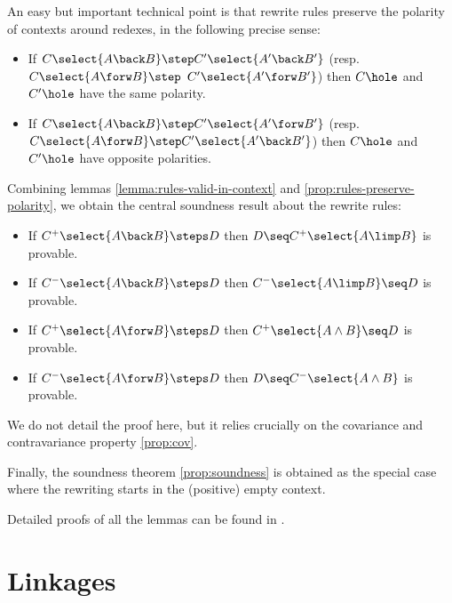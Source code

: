 An easy but important technical point is that rewrite rules preserve the
polarity of contexts around redexes, in the following precise sense:
\begin{lemma}\label{prop:rules-preserve-polarity}
  \phantom{a}
  \begin{itemize}
    \item
      If $C\select{A\back B} \step C'\select{A'\back B'}$
      (resp. $C\select{A \forw B} \step $ $ C' \allowbreak\select{A' \forw B'}$) then
      $C\hole$ and $C'\hole$ have the same polarity.
    \item
      If $C\select{A\back B} \step C'\select{A'\forw B'}$ (resp.
      $C\select{A\forw B} \step C'\select{A'\back B'}$) then $C\hole$ and
      $C'\hole$ have opposite polarities.
  \end{itemize}

\end{lemma}

Combining lemmas \ref{lemma:rules-valid-in-context} and
\ref{prop:rules-preserve-polarity}, we obtain the central soundness result
about the rewrite rules:
\begin{lemma}\label{lemma:rewriting-valid-in-context}
  \phantom{a}
  \begin{itemize}
    \item If $C^+\select{A\back B}\steps D$ then $D \seq C^+\select{A\limp B}$ is provable.
    \item If $C^-\select{A\back B} \steps D$ then $C^-\select{A\limp B}\seq D$ is provable.
    \item If $C^+\select{A \forw B} \steps D$ then $ C^+\select{A \land B}\seq D$ is provable.
    \item If $C^-\select{A \forw B} \steps D$ then $D \seq C^-\select{A \land B}$ is provable.
  \end{itemize}
\end{lemma}

We do not detail the proof here, but it relies crucially on the covariance and
contravariance property \ref{prop:cov}.

Finally, the soundness theorem \ref{prop:soundness} is obtained as the
special case where the rewriting starts in the (positive) empty context.

Detailed proofs of all the lemmas can be found in .

\section{Linkages}

